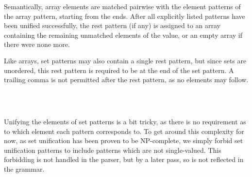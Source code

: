 Semantically, array elements are matched pairwise with the element patterns
of the array pattern, starting from the ends. After all explicitly listed
patterns have been unified successfully, the rest pattern (if any) is assigned
to an array containing the remaining unmatched elements of the value, or an
empty array if there were none more.

\begin{prooftree}
\end{prooftree}

\begin{prooftree}
\end{prooftree}

\begin{prooftree}
\end{prooftree}

Like arrays, set patterns may also contain a single rest pattern, but since sets
are unordered, this rest pattern is required to be at the end of the set pattern.
A trailing comma is not permitted after the rest pattern, as no elements may follow.

\begin{bnf*}
     \\
     \\
\end{bnf*}

Unifying the elements of set patterns is a bit tricky, as there is no requirement
as to which element each pattern corresponds to. To get around this complexity for
now, as set unification has been proven to be NP-complete\cite{setunif}, we simply
forbid set unification patterns to include patterns which are not single-valued.
This forbidding is not handled in the parser, but by a later pass, so is not reflected
in the grammar.

